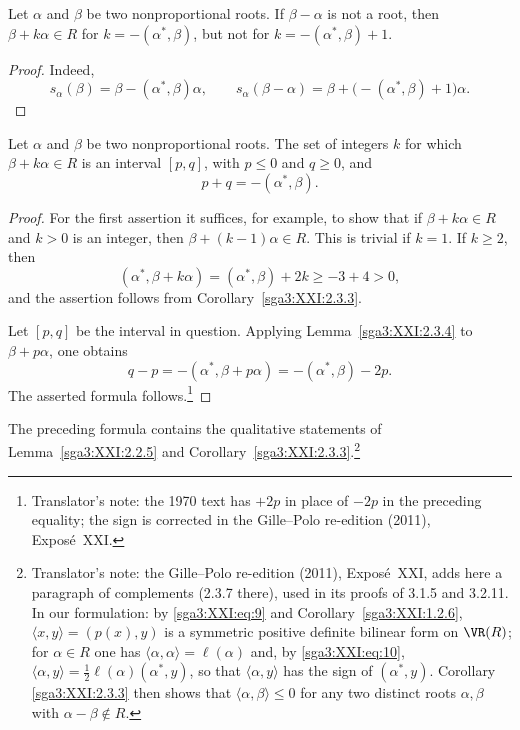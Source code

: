 \begin{lemma}\label{sga3:XXI:2.3.4}
Let \(\alpha\) and \(\beta\) be two nonproportional roots. If
\(\beta-\alpha\) is not a root, then
\(\beta+k\alpha\in R\) for \(k=-(\alpha^\ast,\beta)\), but not for
\(k=-(\alpha^\ast,\beta)+1\).
\end{lemma}

\begin{proof}
Indeed,
\[
 s_\alpha(\beta)=\beta-(\alpha^\ast,\beta)\alpha,
 \qquad
 s_\alpha(\beta-\alpha)=\beta+\bigl(-(\alpha^\ast,\beta)+1\bigr)\alpha.
\]
\end{proof}

\begin{proposition}\label{sga3:XXI:2.3.5}
Let \(\alpha\) and \(\beta\) be two nonproportional roots. The set of
integers \(k\) for which \(\beta+k\alpha\in R\) is an interval
\([p,q]\), with \(p\leq0\) and \(q\geq0\), and
\[
 p+q=-(\alpha^\ast,\beta).
\]
\end{proposition}

\begin{proof}
For the first assertion it suffices, for example, to show that if
\(\beta+k\alpha\in R\) and \(k>0\) is an integer, then
\(\beta+(k-1)\alpha\in R\). This is trivial if \(k=1\). If
\(k\geq2\), then
\[
 (\alpha^\ast,\beta+k\alpha)
 =(\alpha^\ast,\beta)+2k\geq-3+4>0,
\]
and the assertion follows from Corollary~\ref{sga3:XXI:2.3.3}.

Let \([p,q]\) be the interval in question. Applying
Lemma~\ref{sga3:XXI:2.3.4} to \(\beta+p\alpha\), one obtains
\[
 q-p
 =-(\alpha^\ast,\beta+p\alpha)
 =-(\alpha^\ast,\beta)-2p.
\]
The asserted formula follows.\footnote{Translator's note: the 1970 text has
\(+2p\) in place of \(-2p\) in the preceding equality; the sign is corrected in the
Gille--Polo re-edition (2011), Exposé~XXI.}
\end{proof}

\begin{remark}\label{sga3:XXI:2.3.6}
The preceding formula contains the qualitative statements of
Lemma~\ref{sga3:XXI:2.2.5} and
Corollary~\ref{sga3:XXI:2.3.3}.\footnote{Translator's note: the Gille--Polo re-edition (2011), Exposé~XXI, adds here a paragraph
of complements (2.3.7 there), used in its proofs of 3.1.5 and 3.2.11. In our
formulation: by \eqref{sga3:XXI:eq:9} and Corollary~\ref{sga3:XXI:1.2.6},
\(\langle x,y\rangle=(p(x),y)\) is a symmetric positive definite bilinear form on
\(\VR(R)\); for \(\alpha\in R\) one has \(\langle\alpha,\alpha\rangle=\ell(\alpha)\)
and, by \eqref{sga3:XXI:eq:10},
\(\langle\alpha,y\rangle=\frac12\ell(\alpha)(\alpha^\ast,y)\), so that
\(\langle\alpha,y\rangle\) has the sign of \((\alpha^\ast,y)\). Corollary
\ref{sga3:XXI:2.3.3} then shows that \(\langle\alpha,\beta\rangle\leq0\) for any two
distinct roots \(\alpha,\beta\) with \(\alpha-\beta\notin R\).}
\end{remark}


